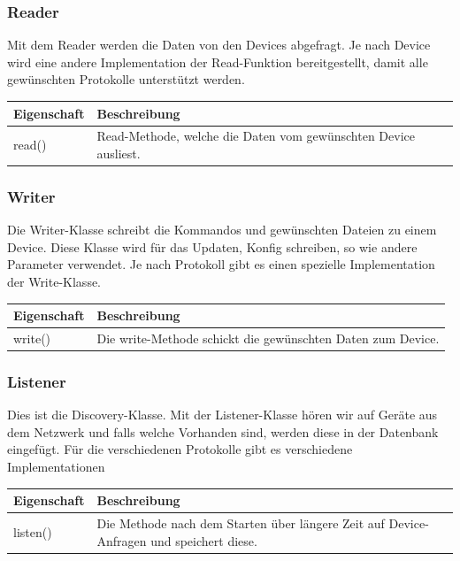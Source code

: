 \subsubsection{Reader}
Mit dem Reader werden die Daten von den Devices abgefragt. Je nach Device wird eine andere Implementation der Read-Funktion bereitgestellt, damit alle gewünschten Protokolle unterstützt werden.
\noindent \begin{table}[H]
\centering
    \begin{tabular}{@{}l p{14.1cm} @{}}\toprule    
    {Eigenschaft} & {Beschreibung}\\ \midrule      
    read() & Read-Methode, welche die Daten vom gewünschten Device ausliest.\\
    \bottomrule
    \end{tabular}
\end{table}

\subsubsection{Writer}
Die Writer-Klasse schreibt die Kommandos und gewünschten Dateien zu einem Device. Diese Klasse wird für das Updaten, Konfig schreiben, so wie andere Parameter verwendet. Je nach Protokoll gibt es einen spezielle Implementation der Write-Klasse.
\noindent \begin{table}[H]
\centering
    \begin{tabular}{@{}l p{14.1cm} @{}}\toprule    
    {Eigenschaft} & {Beschreibung}\\ \midrule      
    write() & Die write-Methode schickt die gewünschten Daten zum Device. \\
    \bottomrule
    \end{tabular}
\end{table}


\subsubsection{Listener}
Dies ist die Discovery-Klasse. Mit der Listener-Klasse hören wir auf Geräte aus dem Netzwerk und falls welche Vorhanden sind, werden diese in der Datenbank eingefügt. Für die verschiedenen Protokolle gibt es verschiedene Implementationen
\begin{table}[H]
\centering
    \begin{tabular}{@{}l p{14.1cm} @{}}\toprule    
    {Eigenschaft} & {Beschreibung}\\ \midrule
    listen() &  Die Methode nach dem Starten über längere Zeit auf Device-Anfragen und speichert diese.\\
    \bottomrule
    \end{tabular}
\end{table}



